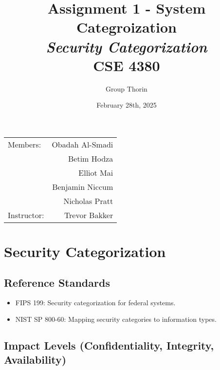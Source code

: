 \documentclass{article}
\title{Assignment 1 - System Categroization \\ \textit{Security Categorization}\\ CSE 4380}
\author{Group Thorin}
\date{February 28th, 2025}
\begin{document}
\maketitle
\begin{center}
\begin{tabular}{l r}

Members: 	& Obadah Al-Smadi\\
			& Betim Hodza\\
			& Elliot Mai\\
			& Benjamin Niccum\\
        	& Nicholas Pratt\\
Instructor: & Trevor Bakker\end{tabular}
\end{center}

\newpage

\setcounter{tocdepth}{2}
\tableofcontents
\newpage


\section{Security Categorization}

\subsection{Reference Standards}
\begin{itemize}
    \item FIPS 199: Security categorization for federal systems.
    \item NIST SP 800-60: Mapping security categories to information types.
\end{itemize}

\subsection{Impact Levels (Confidentiality, Integrity, Availability)}
\end{document}

